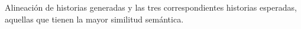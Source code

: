 \documentclass{prgrado}
\begin{document}
Alineación de historias generadas y las tres correspondientes historias esperadas, aquellas que tienen la mayor similitud semántica.






\end{document}
